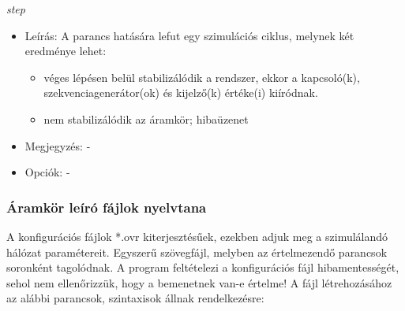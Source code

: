 \textit{step}
\begin{itemize}
	\item Leírás: A parancs hatására lefut egy szimulációs ciklus, melynek két eredménye lehet:
	\begin{itemize}
		\item véges lépésen belül stabilizálódik a rendszer, ekkor a kapcsoló(k), szekvenciagenerátor(ok) és kijelző(k) értéke(i) kiíródnak.
		\item nem stabilizálódik az áramkör; hibaüzenet
	\end{itemize}
	\item Megjegyzés: - 
	\item Opciók: -
\end{itemize}

\subsubsection{Áramkör leíró fájlok nyelvtana}
A konfigurációs fájlok *.ovr kiterjesztésűek, ezekben adjuk meg a szimulálandó hálózat paramétereit. Egyszerű szövegfájl, melyben az értelmezendő parancsok soronként tagolódnak. A program feltételezi a konfigurációs fájl hibamentességét, sehol nem ellenőrizzük, hogy a bemenetnek van-e értelme!\linebreak
A fájl létrehozásához az alábbi parancsok, szintaxisok állnak rendelkezésre:

